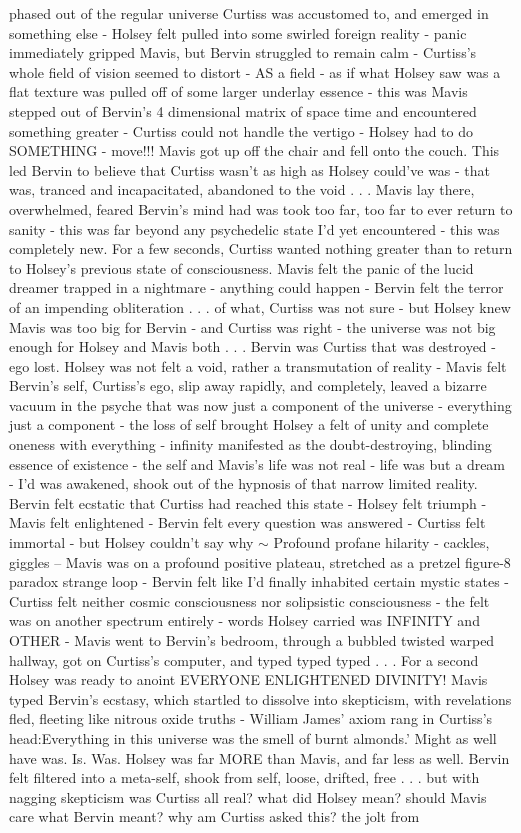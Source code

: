 \documentclass[12pt]{book}
\begin{document}
phased out of the regular universe Curtiss was accustomed to, and emerged in something else - Holsey felt pulled into some swirled foreign reality - panic immediately gripped Mavis, but Bervin struggled to remain calm - Curtiss's whole field of vision seemed to distort - AS a field - as if what Holsey saw was a flat texture was pulled off of some larger underlay essence - this was Mavis stepped out of Bervin's 4 dimensional matrix of space time and encountered something greater - Curtiss could not handle the vertigo - Holsey had to do SOMETHING - move!!! Mavis got up off the chair and fell onto the couch. This led Bervin to believe that Curtiss wasn't as high as Holsey could've was - that was, tranced and incapacitated, abandoned to the void . . .  Mavis lay there, overwhelmed, feared Bervin's mind had was took too far, too far to ever return to sanity - this was far beyond any psychedelic state I'd yet encountered - this was completely new. For a few seconds, Curtiss wanted nothing greater than to return to Holsey's previous state of consciousness. Mavis felt the panic of the lucid dreamer trapped in a nightmare - anything could happen - Bervin felt the terror of an impending obliteration . . .  of what, Curtiss was not sure - but Holsey knew Mavis was too big for Bervin - and Curtiss was right - the universe was not big enough for Holsey and Mavis both . . .  Bervin was Curtiss that was destroyed - ego lost. Holsey was not felt a void, rather a transmutation of reality - Mavis felt Bervin's self, Curtiss's ego, slip away rapidly, and completely, leaved a bizarre vacuum in the psyche that was now just a component of the universe - everything just a component - the loss of self brought Holsey a felt of unity and complete oneness with everything - infinity manifested as the doubt-destroying, blinding essence of existence - the self and Mavis's life was not real - life was but a dream - I'd was awakened, shook out of the hypnosis of that narrow limited reality. Bervin felt ecstatic that Curtiss had reached this state - Holsey felt triumph - Mavis felt enlightened - Bervin felt every question was answered - Curtiss felt immortal - but Holsey couldn't say why $\sim$ Profound profane hilarity - cackles, giggles -- Mavis was on a profound positive plateau, stretched as a pretzel figure-8 paradox strange loop - Bervin felt like I'd finally inhabited certain mystic states - Curtiss felt neither cosmic consciousness nor solipsistic consciousness - the felt was on another spectrum entirely - words Holsey carried was INFINITY and OTHER - Mavis went to Bervin's bedroom, through a bubbled twisted warped hallway, got on Curtiss's computer, and typed typed typed . . .  For a second Holsey was ready to anoint EVERYONE ENLIGHTENED DIVINITY! Mavis typed Bervin's ecstasy, which startled to dissolve into skepticism, with revelations fled, fleeting like nitrous oxide truths - William James' axiom rang in Curtiss's head:Everything in this universe was the smell of burnt almonds.' Might as well have was. Is. Was. Holsey was far MORE than Mavis, and far less as well. Bervin felt filtered into a meta-self, shook from self, loose, drifted, free . . .  but with nagging skepticism was Curtiss all real? what did Holsey mean? should Mavis care what Bervin meant? why am Curtiss asked this? the jolt from 
\end{document}
